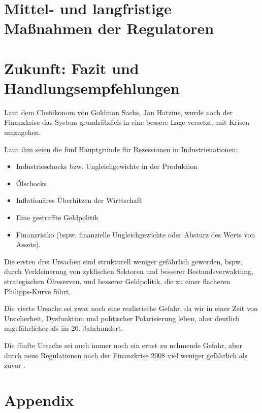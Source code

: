 \documentclass[a4paper,11pt]{report}
\begin{document}
\chapter{Mittel- und langfristige Maßnahmen der Regulatoren}

\chapter{Zukunft: Fazit und Handlungsempfehlungen}
Laut dem Chef\"okonom von Goldman Sachs, Jan Hatzius, wurde nach der Finanzkrise
das System grunds\"atzlich in eine bessere Lage versetzt, mit Krisen umzugehen.

Laut ihm seien die f\"unf Hauptgr\"unde f\"ur Rezessionen in
Industrienationen:

\begin{itemize}
  \item Industrieschocks bzw. Ungleichgewichte in der Produktion
  \item \"Olschocks
  \item Inflation\"ares \"Uberhitzen der Wirttschaft
  \item Eine gestraffte Geldpolitik
  \item Finanzrisiko (bspw. finanzielle Ungleichgewichte oder 
  Absturz des Werts von Assets).
\end{itemize}

Die ersten drei Ursachen sind strukturell weniger gef\"ahrlich geworden,
bspw. durch Verkleinerung von zyklischen Sektoren und besserer
Bestandsverwaktung, strategischen \"Olreserven, und besserer Geldpolitik, die zu 
einer flacheren Philipps-Kurve f\"uhrt.

Die vierte Ursache
sei zwar noch eine realistische Gefahr, da wir in einer Zeit von 
Ursicherheit, Dysfunktion und politischer Polarisierung leben,
aber deutlich ungef\"ahrlicher als im 20. Jahrhundert.

Die f\"unfte Ursache sei auch immer noch ein ernst zu
nehmende Gefahr, aber durch neue Regulationen nach der Finanzkrise
2008 viel weniger gef\"ahrlich als zuvor \parencite{gs1}.

\newpage
\printbibliography[
  heading=bibintoc,
  title={Literaturverzeichnis}
  ]

\newpage

\chapter{Appendix}
\end{document}
